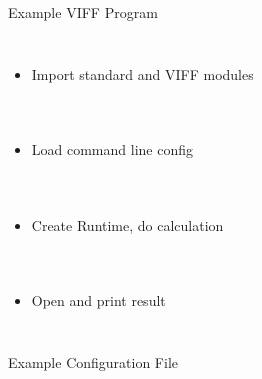 \documentclass[t,noamsthm]{beamer}
\begin{document}
\begin{frame}{Example VIFF Program}

\mbox{}\vspace{-2\baselineskip}

\begin{columns}
  
  \begin{itemize}
  \item Import standard and VIFF modules
  \end{itemize}
\end{columns}

\vspace{-0.75\baselineskip}

\begin{columns}
  \begin{itemize}
  \item<2-> Load command line config
  \end{itemize}
\end{columns}

\vspace{-0.75\baselineskip}

\begin{columns}
  \begin{itemize}
  \item<3-> Create Runtime, do calculation
  \end{itemize}
\end{columns}

\vspace{-0.75\baselineskip}

\begin{columns}
  \begin{itemize}
  \item<4-> Open and print result
  \end{itemize}
\end{columns}

\end{frame}

\begin{frame}{Example Configuration File}


  

\end{frame}
\end{document}
